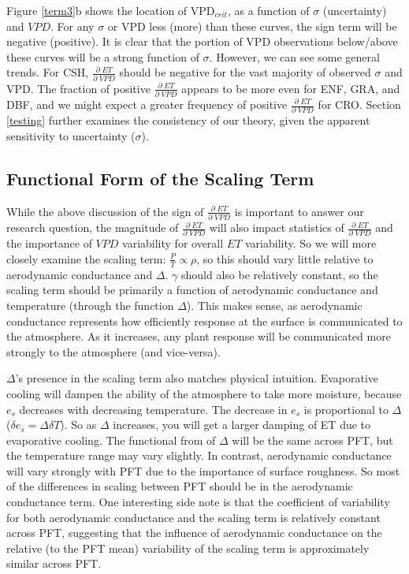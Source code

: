 \documentclass[draft,linenumbers]{agujournal}
\begin{document}
Figure \ref{term3}b shows the location of VPD$_{crit}$, as a function of $\sigma$ (uncertainty) and $VPD$. For any $\sigma$ or VPD less (more) than these curves, the sign term will be negative (positive). It is clear that the portion of VPD observations below/above these curves will be a strong function of $\sigma$. However, we can see some general trends. For CSH, $\frac{\partial \; ET}{\partial \; VPD}$ should be negative for the vast majority of observed $\sigma$ and VPD. The fraction of positive $\frac{\partial \; ET}{\partial \; VPD}$ appears to be more even for ENF, GRA, and DBF, and we might expect a greater frequency of positive $\frac{\partial \; ET}{\partial \; VPD}$ for CRO. Section \ref{testing} further examines the consistency of our theory, given  the apparent sensitivity to uncertainty ($\sigma$).


\subsection{Functional Form of the Scaling Term}

While the above discussion of the sign of $\frac{\partial \; ET}{\partial \; VPD}$ is important to answer our research question, the magnitude of $\frac{\partial \; ET}{\partial \; VPD}$ will also impact statistics of $\frac{\partial \; ET}{\partial \; VPD}$ and the importance of $VPD$ variability for overall $ET$ variability. So we will more closely examine the scaling term: $\frac{P}{T} \propto \rho$, so this should vary little relative to aerodynamic conductance and $\Delta$. $\gamma$ should also be relatively constant, so the scaling term should be primarily a function of aerodynamic conductance and temperature (through the function $\Delta$). This makes sense, as aerodynamic conductance represents how efficiently response at the surface is communicated to the atmosphere. As it increases, any plant response will be communicated more strongly to the atmosphere (and vice-versa).

$\Delta$'s presence in the scaling term also matches physical intuition. Evaporative cooling will dampen the ability of the atmosphere to take more moisture, because $e_{s}$ decreases with decreasing temperature. The decrease in $e_{s}$ is proportional to $\Delta$ ($\delta e_{s} = \Delta \delta T$). So as $\Delta$ increases, you will get a larger damping of ET due to evaporative cooling.  The functional from of $\Delta$ will be the same across PFT, but the temperature range may vary slightly. In contrast, aerodynamic conductance will vary strongly with PFT due to the importance of surface roughness. So most of the differences in scaling between PFT should be in the aerodynamic conductance term. One interesting side note is that the coefficient of variability for both aerodynamic conductance and the scaling term is relatively constant across PFT, suggesting that the influence of aerodynamic conductance on the relative (to the PFT mean) variability of the scaling term is approximately similar across PFT.
\end{document}
